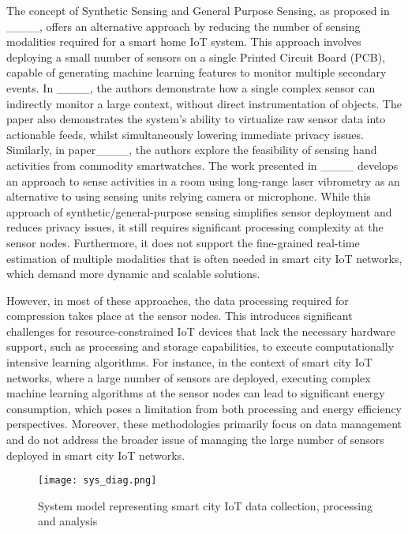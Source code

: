 The concept of Synthetic Sensing and General Purpose Sensing, as proposed in ____, offers an alternative approach by reducing the number of sensing modalities required for a smart home IoT system. This approach involves deploying a small number of sensors on a single Printed Circuit Board (PCB), capable of generating machine learning features to monitor multiple secondary events. In ____, the authors demonstrate how a single complex sensor can indirectly monitor a large context, without direct instrumentation of objects. The paper also demonstrates the system's ability to virtualize raw sensor data into actionable feeds, whilst simultaneously lowering immediate privacy issues. Similarly, in paper____, the authors explore the feasibility of sensing hand activities from commodity smartwatches. The work presented in ____ develops an approach to sense activities in a room using long-range laser vibrometry as an alternative to using sensing units relying camera or microphone. While this approach of synthetic/general-purpose sensing simplifies sensor deployment and reduces privacy issues, it still requires significant processing complexity at the sensor nodes. Furthermore, it does not support the fine-grained real-time estimation of multiple modalities that is often needed in smart city IoT networks, which demand more dynamic and scalable solutions.

However, in most of these approaches, the data processing required for compression takes place at the sensor nodes. This introduces significant challenges for resource-constrained IoT devices that lack the necessary hardware support, such as processing and storage capabilities, to execute computationally intensive learning algorithms. For instance, in the context of smart city IoT networks, where a large number of sensors are deployed, executing complex machine learning algorithms at the sensor nodes can lead to significant energy consumption, which poses a limitation from both processing and energy efficiency perspectives. Moreover, these methodologies primarily focus on data management and do not address the broader issue of managing the large number of sensors deployed in smart city IoT networks.

\label{seciii}
\begin{figure*}[h]
	\centering
	\texttt{[image: sys\_diag.png]}
	\caption{System model representing smart city IoT data collection, processing and analysis}
	\label{sys_dia}
\end{figure*}